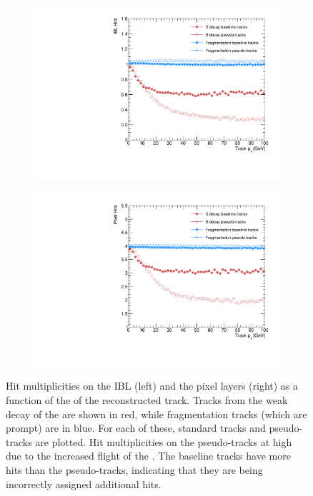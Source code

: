 %
\begin{figure}[!htbp]
    \centering
    \begin{subfigure}{.5\textwidth}
      \centering
      \includegraphics[width=\textwidth]{chapters/3.tracking/figs/overlay_po_nHitsOnIBL_From_B_pT.pdf}
    \end{subfigure}%
    \begin{subfigure}{.5\textwidth}
      \centering
      \includegraphics[width=\textwidth]{chapters/3.tracking/figs/overlay_po_nHitsOnPix_From_B_pT.pdf}
    \end{subfigure}
    \caption{
      Hit multiplicities on the IBL (left) and the pixel layers (right) as a function of the \pT of the reconstructed track.
      Tracks from the weak decay of the \bhadron are shown in red, while fragmentation tracks (which are prompt) are in blue.
      For each of these, standard tracks and pseudo-tracks are plotted.
      Hit multiplicities on the pseudo-tracks at high \pt due to the increased flight of the \bhadron. 
      The baseline tracks have more hits than the pseudo-tracks, indicating that they are being incorrectly assigned additional hits.}
    \label{fig:total hits on pix bs, frag}
\end{figure}
%



